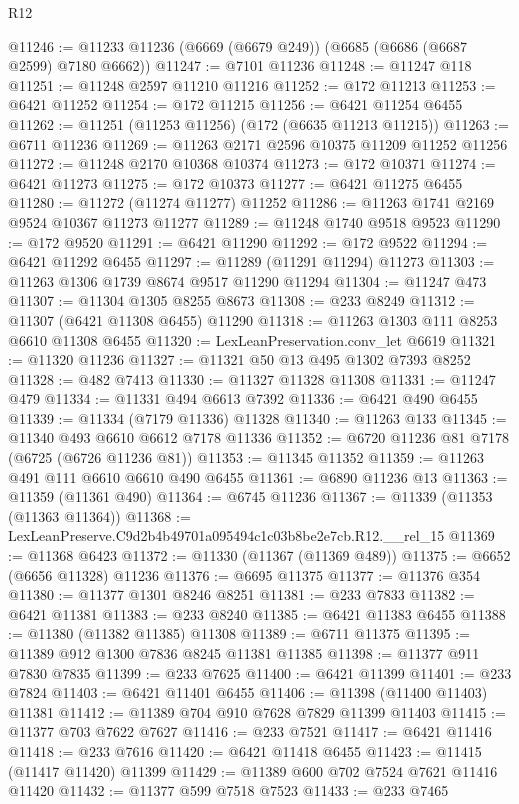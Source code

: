 \begin{lexlean}{R12}
\begin{coremodule}
@11246 := @11233 @11236 (@6669 (@6679 @249)) (@6685 (@6686 (@6687 @2599) @7180 @6662))
@11247 := @7101 @11236
@11248 := @11247 @118
@11251 := @11248 @2597 @11210 @11216
@11252 := @172 @11213
@11253 := @6421 @11252
@11254 := @172 @11215
@11256 := @6421 @11254 @6455
@11262 := @11251 (@11253 @11256) (@172 (@6635 @11213 @11215))
@11263 := @6711 @11236
@11269 := @11263 @2171 @2596 @10375 @11209 @11252 @11256
@11272 := @11248 @2170 @10368 @10374
@11273 := @172 @10371
@11274 := @6421 @11273
@11275 := @172 @10373
@11277 := @6421 @11275 @6455
@11280 := @11272 (@11274 @11277) @11252
@11286 := @11263 @1741 @2169 @9524 @10367 @11273 @11277
@11289 := @11248 @1740 @9518 @9523
@11290 := @172 @9520
@11291 := @6421 @11290
@11292 := @172 @9522
@11294 := @6421 @11292 @6455
@11297 := @11289 (@11291 @11294) @11273
@11303 := @11263 @1306 @1739 @8674 @9517 @11290 @11294
@11304 := @11247 @473
@11307 := @11304 @1305 @8255 @8673
@11308 := @233 @8249
@11312 := @11307 (@6421 @11308 @6455) @11290
@11318 := @11263 @1303 @111 @8253 @6610 @11308 @6455
@11320 := LexLeanPreservation.conv_let @6619
@11321 := @11320 @11236
@11327 := @11321 @50 @13 @495 @1302 @7393 @8252
@11328 := @482 @7413
@11330 := @11327 @11328 @11308
@11331 := @11247 @479
@11334 := @11331 @494 @6613 @7392
@11336 := @6421 @490 @6455
@11339 := @11334 (@7179 @11336) @11328
@11340 := @11263 @133
@11345 := @11340 @493 @6610 @6612 @7178 @11336
@11352 := @6720 @11236 @81 @7178 (@6725 (@6726 @11236 @81))
@11353 := @11345 @11352
@11359 := @11263 @491 @111 @6610 @6610 @490 @6455
@11361 := @6890 @11236 @13
@11363 := @11359 (@11361 @490)
@11364 := @6745 @11236
@11367 := @11339 (@11353 (@11363 @11364))
@11368 := LexLeanPreserve.C9d2b4b49701a095494c1c03b8be2e7cb.R12.__rel_15
@11369 := @11368 @6423
@11372 := @11330 (@11367 (@11369 @489))
@11375 := @6652 (@6656 @11328) @11236
@11376 := @6695 @11375
@11377 := @11376 @354
@11380 := @11377 @1301 @8246 @8251
@11381 := @233 @7833
@11382 := @6421 @11381
@11383 := @233 @8240
@11385 := @6421 @11383 @6455
@11388 := @11380 (@11382 @11385) @11308
@11389 := @6711 @11375
@11395 := @11389 @912 @1300 @7836 @8245 @11381 @11385
@11398 := @11377 @911 @7830 @7835
@11399 := @233 @7625
@11400 := @6421 @11399
@11401 := @233 @7824
@11403 := @6421 @11401 @6455
@11406 := @11398 (@11400 @11403) @11381
@11412 := @11389 @704 @910 @7628 @7829 @11399 @11403
@11415 := @11377 @703 @7622 @7627
@11416 := @233 @7521
@11417 := @6421 @11416
@11418 := @233 @7616
@11420 := @6421 @11418 @6455
@11423 := @11415 (@11417 @11420) @11399
@11429 := @11389 @600 @702 @7524 @7621 @11416 @11420
@11432 := @11377 @599 @7518 @7523
@11433 := @233 @7465

\end{coremodule}
\end{lexlean}
